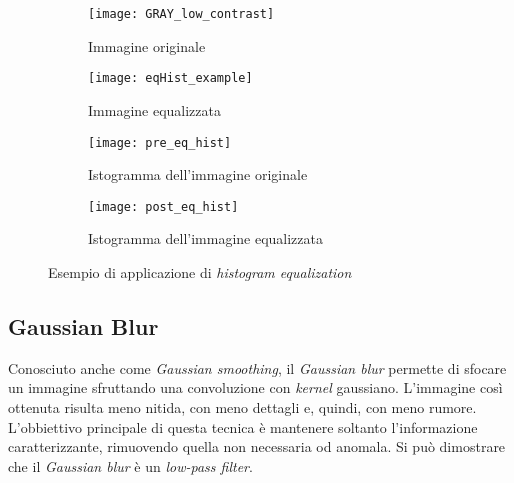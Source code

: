 \clearpage
\begin{figure}[ht]
  \begin{center}
  \begin{subfigure}{.49\linewidth}
    \centering\texttt{[image: GRAY\_low\_contrast]}
    \caption{Immagine originale}
  \end{subfigure}
  \begin{subfigure}{.49\linewidth}
    \centering\texttt{[image: eqHist\_example]}
    \caption{Immagine equalizzata}
  \end{subfigure}
  \begin{subfigure}{.73\linewidth}
    \centering\texttt{[image: pre\_eq\_hist]}
    \caption{Istogramma dell'immagine originale}
    \label{fig:hist_pre_eq_example}
  \end{subfigure}
  \begin{subfigure}{.73\linewidth}
    \centering\texttt{[image: post\_eq\_hist]}
    \caption{Istogramma dell'immagine equalizzata}
    \label{fig:hist_post_eq_example}
  \end{subfigure}
  \end{center}
  \caption{Esempio di applicazione di \textit{histogram equalization}}
    \label{fig:hist_eq_example}
\end{figure}

\clearpage
\subsection {Gaussian Blur}
Conosciuto anche come \textit{Gaussian smoothing}, il \textit{Gaussian blur} permette di sfocare un immagine sfruttando una convoluzione con \textit{kernel} gaussiano.
L'immagine così ottenuta risulta meno nitida, con meno dettagli e, quindi, con meno rumore.
L'obbiettivo principale di questa tecnica è mantenere soltanto l'informazione caratterizzante, rimuovendo quella non necessaria od anomala.
Si può dimostrare che il \textit{Gaussian blur} è un \textit{low-pass filter}.

